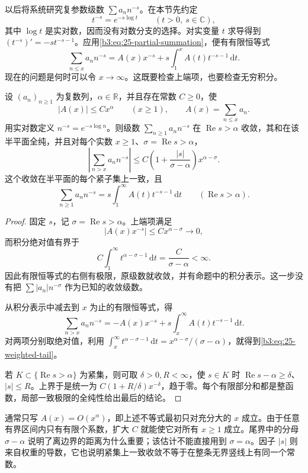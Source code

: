 以后将系统研究复参数级数 \(\sum a_nn^{-s}\)。在本节先约定
\[
 t^{-s}=e^{-s\log t}\qquad(t>0,\ s\in\mathbb C),
\]
其中 \(\log t\) 是实对数，因而没有对数分支的选择。对实变量 \(t\) 求导得到 \((t^{-s})'=-s t^{-s-1}\)。应用\eqref{b3:eq:25-partial-summation}，便有有限恒等式
\[
 \sum_{n\le x}a_nn^{-s}
 =A(x)x^{-s}+s\int_1^x A(t)t^{-s-1}\,\mathrm dt.
\]
现在的问题是何时可以令 \(x\to\infty\)。这既要检查上端项，也要检查无穷积分。

\begin{proposition}[部分和增长与级数收敛]\label{b3:prop:25-partial-sum-convergence}
设 \((a_n)_{n\ge1}\) 为复数列，\(\alpha\in\mathbb R\)，并且存在常数 \(C\ge0\)，使
\[
 |A(x)|\le Cx^\alpha\qquad(x\ge1),
 \qquad A(x)=\sum_{n\le x}a_n.
\]
用实对数定义 \(n^{-s}=e^{-s\log n}\)。则级数 \(\sum_{n\ge1}a_nn^{-s}\) 在 \(\operatorname{Re}s>\alpha\) 收敛，其和在该半平面全纯，并且对每个实数 \(x\ge1\)、\(\sigma=\operatorname{Re}s>\alpha\)，
\begin{equation}\label{b3:eq:25-weighted-tail}
 \left|\sum_{n>x}a_nn^{-s}\right|
 \le C\left(1+\frac{|s|}{\sigma-\alpha}\right)x^{\alpha-\sigma}.
\end{equation}
这个收敛在半平面的每个紧子集上一致，且
\[
 \sum_{n\ge1}a_nn^{-s}
 =s\int_1^\infty A(t)t^{-s-1}\,\mathrm dt
 \qquad(\operatorname{Re}s>\alpha).
\]
\end{proposition}
\begin{proof}
固定 \(s\)，记 \(\sigma=\operatorname{Re}s>\alpha\)。上端项满足
\[
 |A(x)x^{-s}|\le Cx^{\alpha-\sigma}\longrightarrow0,
\]
而积分绝对值有界于
\[
 C\int_1^\infty t^{\alpha-\sigma-1}\,\mathrm dt
 =\frac C{\sigma-\alpha}<\infty.
\]
因此有限恒等式的右侧有极限，原级数就收敛，并有命题中的积分表示。这一步没有把 \(\sum|a_n|n^{-\sigma}\) 作为已知的收敛级数。

从积分表示中减去到 \(x\) 为止的有限恒等式，得
\[
 \sum_{n>x}a_nn^{-s}
 =-A(x)x^{-s}+s\int_x^\infty A(t)t^{-s-1}\,\mathrm dt.
\]
对两项分别取绝对值，利用
\(\int_x^\infty t^{\alpha-\sigma-1}\,\mathrm dt
 =x^{\alpha-\sigma}/(\sigma-\alpha)\)，就得到\eqref{b3:eq:25-weighted-tail}。

若 \(K\subset\{\operatorname{Re}s>\alpha\}\) 为紧集，则可取 \(\delta>0,R<\infty\)，使 \(s\in K\) 时 \(\operatorname{Re}s-\alpha\ge\delta\)、\(|s|\le R\)。上界于是统一为 \(C(1+R/\delta)x^{-\delta}\)，趋于零。每个有限部分和都是整函数，局部一致极限的全纯性给出最后的结论。
\end{proof}

通常只写 \(A(x)=O(x^\alpha)\)，即上述不等式最初只对充分大的 \(x\) 成立。由于任意有界区间内只有有限个系数，扩大 \(C\) 就能使它对所有 \(x\ge1\) 成立。尾界中的分母 \(\sigma-\alpha\) 说明了离边界的距离为什么重要；该估计不能直接用到 \(\sigma=\alpha\)。因子 \(|s|\) 则来自权重的导数，它也说明紧集上一致收敛不等于在整条无界竖线上有同一个常数。

